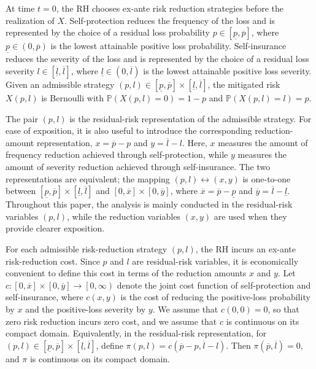 \documentclass[a4paper,12pt]{article}
\begin{document}
At time $t=0$, the RH chooses ex-ante risk reduction strategies before the realization of $X$. Self-protection reduces the frequency of the loss and is represented by the choice of a residual loss probability $p\in\left[\underline{p},\overline{p}\right]$, where $\underline{p}\in\left(0,\overline{p}\right)$ is the lowest attainable positive loss probability. Self-insurance reduces the severity of the loss and is represented by the choice of a residual loss severity $l\in\left[\underline{l},\overline{l}\right]$, where $\underline{l}\in\left(0,\overline{l}\right)$ is the lowest attainable positive loss severity. Given an admissible strategy $\left(p,l\right)\in\left[\underline{p},\overline{p}\right]\times\left[\underline{l},\overline{l}\right]$, the mitigated risk $X\left(p,l\right)$ is Bernoulli with $\mathbb{P}\left(X\left(p,l\right)=0\right)=1-p$ and $\mathbb{P}\left(X\left(p,l\right)=l\right)=p$.

The pair $\left(p,l\right)$ is the residual-risk representation of the admissible strategy. For ease of exposition, it is also useful to introduce the corresponding reduction-amount representation, $x=\overline{p}-p$ and $y=\overline{l}-l$. Here, $x$ measures the amount of frequency reduction achieved through self-protection, while $y$ measures the amount of severity reduction achieved through self-insurance. The two representations are equivalent; the mapping $\left(p,l\right)\leftrightarrow\left(x,y\right)$ is one-to-one between $\left[\underline{p},\overline{p}\right]\times\left[\underline{l},\overline{l}\right]$ and $\left[0,\overline{x}\right]\times\left[0,\overline{y}\right]$, where $\overline{x}=\overline{p}-\underline{p}$ and $\overline{y}=\overline{l}-\underline{l}$. Throughout this paper, the analysis is mainly conducted in the residual-risk variables $\left(p,l\right)$, while the reduction variables $\left(x,y\right)$ are used when they provide clearer exposition.

For each admissible risk-reduction strategy $\left(p,l\right)$, the RH incurs an ex-ante risk-reduction cost. Since $p$ and $l$ are residual-risk variables, it is economically convenient to define this cost in terms of the reduction amounts $x$ and $y$. Let $c:\left[0,\overline{x}\right]\times\left[0,\overline{y}\right]\rightarrow\left[0,\infty\right)$ denote the joint cost function of self-protection and self-insurance, where $c\left(x,y\right)$ is the cost of reducing the positive-loss probability by $x$ and the positive-loss severity by $y$. We assume that $c\left(0,0\right)=0$, so that zero risk reduction incurs zero cost, and we assume that $c$ is continuous on its compact domain. Equivalently, in the residual-risk representation, for $\left(p,l\right)\in\left[\underline{p},\overline{p}\right]\times\left[\underline{l},\overline{l}\right]$, define $\pi\left(p,l\right)=c\left(\overline{p}-p,\overline{l}-l\right)$. Then $\pi\left(\overline{p},\overline{l}\right)=0$, and $\pi$ is continuous on its compact domain.
\end{document}
